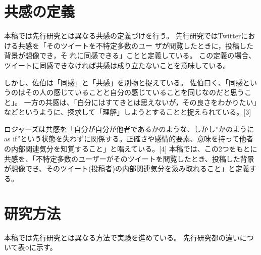 \documentclass[dvipdfmx]{issj}
\begin{document}
\section{共感の定義}  %
本稿では先行研究とは異なる共感の定義づけを行う。
先行研究ではTwitterにおける共感を「そのツイートを不特定多数のユー ザが閲覧したときに，投稿した背景が想像でき，そ れに同感できる」ことと定義している。
この定義の場合、ツイートに同感できなければ共感は成り立たないことを意味している。


しかし、佐伯は「同感」と「共感」を別物と捉えている。
佐伯曰く、「同感というのはその人の感じていることと自分の感じていることを同じなのだと思うこと」。
一方の共感は、「白分にはすてきとは思えないが，その良さをわかりたい」などというように、探求して「理解」しようとすることと捉えられている。[3]


ロジャーズは共感を「自分が自分が他者であるかのような、しかし”かのようにas if”という状態を失わずに関係する。正確さや感情的要素、意味を持って他者の内部関連気分を知覚すること」と唱えている。[4] 本稿では、この2つをもとに共感を、「不特定多数のユーザーがそのツイートを閲覧したとき、投稿した背景が想像でき、そのツイート(投稿者)の内部関連気分を汲み取れること」と定義する。



\section{研究方法}  %
本稿では先行研究とは異なる方法で実験を進めている。
先行研究都の違いについて表○に示す。
\end{document}
